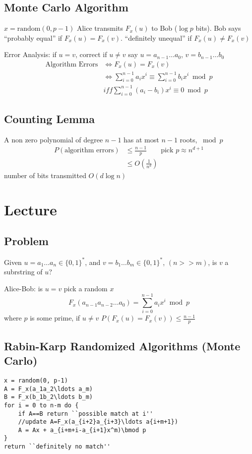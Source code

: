 \documentclass[english,12pt]{article}
\theoremstyle{plain}
\theoremstyle{definition}
\theoremstyle{definition} %
\begin{document}
\subsection{Monte Carlo Algorithm}
$x=\text{random}(0,p-1)$
Alice transmits $F_x(u)$ to Bob ($\log p$ bits).  Bob says ``probably equal'' if $F_x(u)=F_x(v)$.  ``definitely unequal'' if $F_x(u)\ne F_x(v)$

Error Analysis: if $u=v$, correct
if $u\ne v$ say $u=a_{n-1}\ldots a_0$, $v=b_{n-1}\ldots b_0$
\begin{align*}
\text{Algorithm Errors} &\iff F_x(u) = F_x(v)\\
&\iff \sum_{i=0}^{n-1}a_ix^i\equiv \sum_{i=0}^{n-1} b_ix^i\bmod p\\
&iff \sum_{i=0}^{n-1}(a_i-b_i)x^i\equiv 0\bmod p
\end{align*}

\subsection{Counting Lemma}
A non zero polynomial of degree $n-1$ has at most $n-1$ roots, $\bmod p$
\begin{align*}
P(\text{algorithm errors})&\le \frac{n-1}{p}\qquad \text{pick }p\approx n^{d+1}\\
&\le O\left(\frac{1}{n^d}\right)
\end{align*}
number of bits transmitted $O(d\log n)$

\section{Lecture}
\subsection{Problem}
Given $u=a_1\ldots a_n\in\{0,1\}^\ast$, and $v=b_1\ldots b_m\in\{0,1\}^\ast$, $(n>> m)$, is $v$ a subrstring of $u$?

Alice-Bob: is $u=v$
pick a random $x$
\[F_x(a_{n-1}a_{n-2}\ldots a_0) = \sum_{i=0}^{n-1}a_ix^i\bmod p\]
where $p$ is some prime, if $u\ne v$  $P(F_x(u) = F_x(v))\le\frac{n-1}{p}$

\subsection{Rabin-Karp Randomized Algorithms (Monte Carlo)}
\begin{verbatim}
x = random(0, p-1)
A = F_x(a_1a_2\ldots a_m)
B = F_x(b_1b_2\ldots b_m)
for i = 0 to n-m do {
    if A==B return ``possible match at i''
    //update A=F_x(a_{i+2}a_{i+3}\ldots a{i+m+1})
    A = Ax + a_{i+m+i-a_{i+1}x^m)\bmod p
}
return ``definitely no match''
\end{verbatim}
\end{document}
